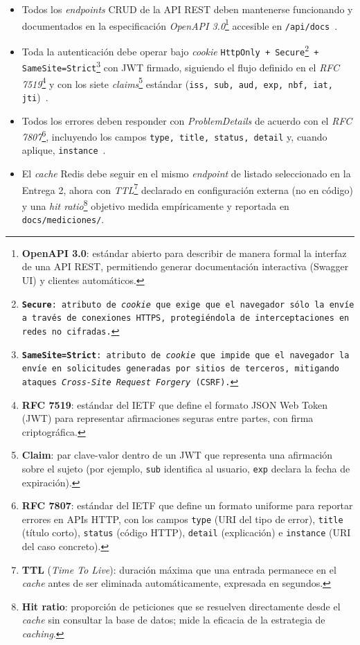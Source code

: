 \documentclass[11pt,a4paper]{article}
\begin{document}
\begin{itemize}
    \item Todos los \emph{endpoints} CRUD de la API REST deben mantenerse funcionando y documentados en la especificaci\'{o}n \emph{OpenAPI 3.0}\footnote{\textbf{OpenAPI 3.0}: est\'{a}ndar abierto para describir de manera formal la interfaz de una API REST, permitiendo generar documentaci\'{o}n interactiva (Swagger UI) y clientes autom\'{a}ticos.} accesible en \texttt{/api/docs}~\cite{fielding2000rest,walls2022spring}.
    \item Toda la autenticaci\'{o}n debe operar bajo \emph{cookie} \texttt{HttpOnly + Secure\footnote{\textbf{Secure}: atributo de \emph{cookie} que exige que el navegador s\'{o}lo la env\'{i}e a trav\'{e}s de conexiones HTTPS, protegi\'{e}ndola de interceptaciones en redes no cifradas.} + SameSite=Strict\footnote{\textbf{SameSite=Strict}: atributo de \emph{cookie} que impide que el navegador la env\'{i}e en solicitudes generadas por sitios de terceros, mitigando ataques \emph{Cross-Site Request Forgery} (CSRF).}} con JWT firmado, siguiendo el flujo definido en el \emph{RFC 7519}\footnote{\textbf{RFC 7519}: est\'{a}ndar del IETF que define el formato JSON Web Token (JWT) para representar afirmaciones seguras entre partes, con firma criptogr\'{a}fica.} y con los siete \emph{claims}\footnote{\textbf{Claim}: par clave-valor dentro de un JWT que representa una afirmaci\'{o}n sobre el sujeto (por ejemplo, \texttt{sub} identifica al usuario, \texttt{exp} declara la fecha de expiraci\'{o}n).} est\'{a}ndar (\texttt{iss, sub, aud, exp, nbf, iat, jti})~\cite{jones2015jwt}.
    \item Todos los errores deben responder con \emph{ProblemDetails} de acuerdo con el \emph{RFC 7807}\footnote{\textbf{RFC 7807}: est\'{a}ndar del IETF que define un formato uniforme para reportar errores en APIs HTTP, con los campos \texttt{type} (URI del tipo de error), \texttt{title} (t\'{i}tulo corto), \texttt{status} (c\'{o}digo HTTP), \texttt{detail} (explicaci\'{o}n) e \texttt{instance} (URI del caso concreto).}, incluyendo los campos \texttt{type, title, status, detail} y, cuando aplique, \texttt{instance}~\cite{rfc7807}.
    \item El \emph{cache} Redis debe seguir en el mismo \emph{endpoint} de listado seleccionado en la Entrega 2, ahora con \emph{TTL}\footnote{\textbf{TTL} (\emph{Time To Live}): duraci\'{o}n m\'{a}xima que una entrada permanece en el \emph{cache} antes de ser eliminada autom\'{a}ticamente, expresada en segundos.} declarado en configuraci\'{o}n externa (no en c\'{o}digo) y una \emph{hit ratio}\footnote{\textbf{Hit ratio}: proporci\'{o}n de peticiones que se resuelven directamente desde el \emph{cache} sin consultar la base de datos; mide la eficacia de la estrategia de \emph{caching}.} objetivo medida emp\'{i}ricamente y reportada en \texttt{docs/mediciones/}.
\end{itemize}
\end{document}
